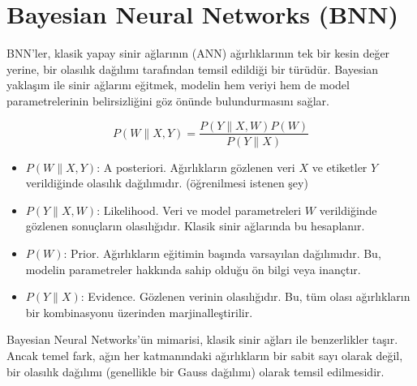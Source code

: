 \section{Bayesian Neural Networks (BNN)}

BNN'ler, klasik yapay sinir ağlarının (ANN) ağırlıklarının tek bir kesin değer yerine, bir olasılık dağılımı tarafından temsil edildiği bir türüdür. Bayesian yaklaşım ile sinir ağlarını eğitmek, modelin hem veriyi hem de model parametrelerinin belirsizliğini göz önünde bulundurmasını sağlar.

\[ P(W \| X, Y) = \frac{P(Y \| X, W) P(W)}{P(Y \| X)} \]

\begin{itemize}
    \item $P(W \| X, Y)$: A posteriori. Ağırlıkların gözlenen veri $X$ ve etiketler $Y$ verildiğinde olasılık dağılımıdır. (öğrenilmesi istenen şey)
    \item $P(Y \| X, W)$: Likelihood. Veri ve model parametreleri $W$ verildiğinde gözlenen sonuçların olasılığıdır. Klasik sinir ağlarında bu hesaplanır.
    \item $P(W)$: Prior. Ağırlıkların eğitimin başında varsayılan dağılımıdır. Bu, modelin parametreler hakkında sahip olduğu ön bilgi veya inançtır.
    \item $P(Y \| X)$: Evidence. Gözlenen verinin olasılığıdır. Bu, tüm olası ağırlıkların bir kombinasyonu üzerinden marjinalleştirilir.
\end{itemize}

Bayesian Neural Networks'ün mimarisi, klasik sinir ağları ile benzerlikler taşır. Ancak temel fark, ağın her katmanındaki ağırlıkların bir sabit sayı olarak değil, bir olasılık dağılımı (genellikle bir Gauss dağılımı) olarak temsil edilmesidir.

\newpage
